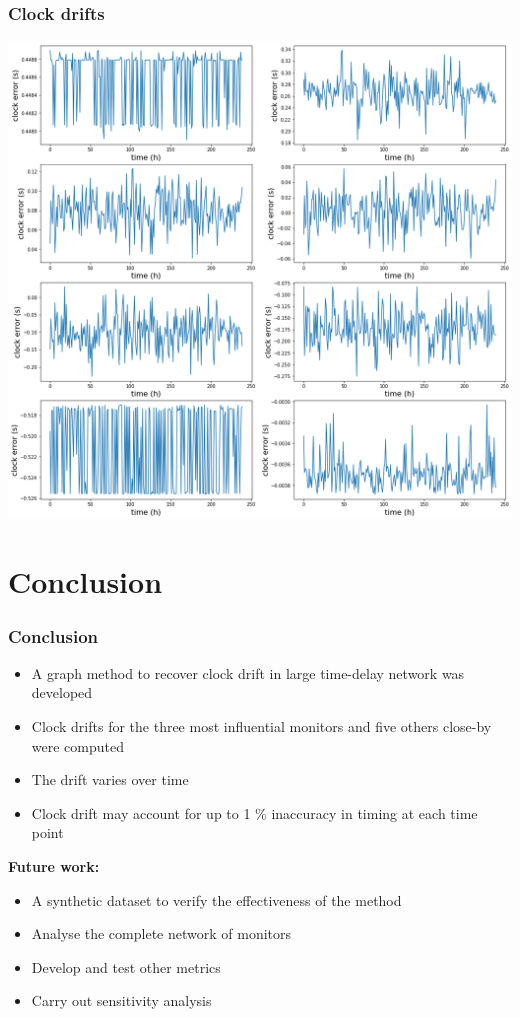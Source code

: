 \documentclass{beamer}
\begin{document}
 \begin{frame}
\frametitle{Clock drifts}
\includegraphics[height=0.9\textheight]{results-for-eight-network.png}
\end{frame}

\section{Conclusion}
 \begin{frame}
\frametitle{Conclusion}
\begin{itemize}
\item A graph method to recover clock drift in large time-delay network was developed
\item Clock drifts for the three most influential monitors and five others close-by were computed
\item The drift varies over time
\item Clock drift may account for up to 1 \% inaccuracy in timing at each time point
\end{itemize}
\vspace{0.5cm}
\textbf{\large{Future work:}}\normalsize 
\begin{itemize}
\item A synthetic dataset to verify the effectiveness of the method
\item Analyse the complete network of monitors
\item Develop and test other metrics
\item Carry out sensitivity analysis
\end{itemize}
\end{frame}
\end{document}
